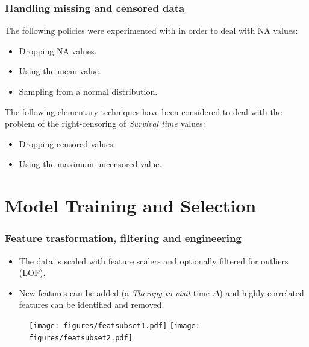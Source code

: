 \documentclass[table]{beamer}
\newcommand*{\sectionp}{\usebeamertemplate*{section p}}
\newcommand{\nologo}{\setbeamertemplate{logo}{}}
\begin{document}
\begin{frame}
\frametitle{Handling missing and censored data}
The following policies were experimented with in order to deal with NA values:
\begin{itemize}
\item Dropping NA values.
\item Using the mean value.
\item Sampling from a normal distribution.
\end{itemize}
\vspace{0.4cm}
The following elementary techniques have been considered to deal with the problem of the right-censoring of \textit{Survival time} values:
\begin{itemize}
\item Dropping censored values.
\item Using the maximum uncensored value.
\end{itemize}
\end{frame}

\section{Model Training and Selection}
\frame{\sectionp}

{\nologo
\begin{frame}
\frametitle{Feature trasformation, filtering and engineering}
\begin{itemize}
\item The data is scaled with feature scalers and optionally filtered for outliers (LOF).
\item New features can be added (a \textit{Therapy to visit} time $\Delta$) and highly correlated features can be identified and removed.
\end{itemize}
\begin{figure}[h]
  \centering
  	\texttt{[image: figures/featsubset1.pdf]}
  	\texttt{[image: figures/featsubset2.pdf]}
\end{figure}
\end{frame}}
\end{document}

